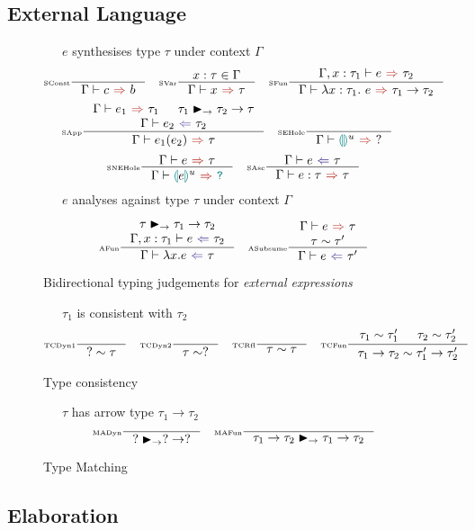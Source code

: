 \subsection{External Language}
\begin{figure}[H]
\ \ \ $e$ synthesises type $\tau$ under context $\Gamma$
\[\inference[\tiny SConst]{}{\synthesis{c}{b}} \quad
\inference[\tiny SVar]{x : \tau \in \Gamma}{\synthesis{x}{\tau}} \quad 
\inference[\tiny SFun]{\synthesis[\Gamma,x:\tau_1]{e}{\tau_2}}{\synthesis{\lambda x:\tau_1.\ e}{\tau_1 \to \tau_2}}\]
\[\inference[\tiny SApp]{\synthesis{e_1}{\tau_1} & \tau_1 \funmatch \tau_2 \to \tau \\ \analysis{e_2}{\tau_2}}{\synthesis{e_1(e_2)}{\tau}} \quad 
\inference[\tiny SEHole]{}{\synthesis{\hole^u}{?}} \quad \]
\[\inference[\tiny SNEHole]{\synthesis{e}{\tau}}{\synthesis{\hole[e]^u}{\dyn}}\quad 
\inference[\tiny SAsc]{\analysis{e}{\tau}}{\synthesis{e : \tau}{\tau}}\]
\ \ \ $e$ analyses against type $\tau$ under context $\Gamma$

\[\inference[\tiny AFun]{\tau \funmatch \tau_1 \to \tau_2\\ \analysis[\Gamma, x:\tau_1]{e}{\tau_2}}{\analysis{\lambda x.e}{\tau}} \quad 
\inference[\tiny ASubsume]{\synthesis{e}{\tau}\\ \tau \sim \tau'}{\analysis{e}{\tau'}}\]

\caption{Bidirectional typing judgements for \textit{external expressions}}
\label{fig:typing}
\end{figure} 


\begin{figure}[H]
\ \ \ $\tau_1$ is consistent with $\tau_2$
\[\inference[\tiny TCDyn1]{}{? \sim \tau} \quad \inference[\tiny TCDyn2]{}{\tau \sim ?} \quad \inference[\tiny TCRfl]{}{\tau \sim \tau} \quad \inference[\tiny TCFun]{\tau_1 \sim \tau_1' & \tau_2 \sim \tau_2'}{\tau_1 \to \tau_2 \sim \tau_1' \to \tau_2'}\]
\caption{Type consistency}
\label{fig:consistency}
\end{figure}

\begin{figure}[h]
\ \ \ $\tau$ has arrow type $\tau_1 \to \tau_2$
\[\inference[\tiny MADyn]{}{? \funmatch ? \to ?} \quad 
\inference[\tiny MAFun]{}{\tau_1 \to \tau_2 \funmatch \tau_1 \to \tau_2}\]
\caption{Type Matching}
\label{fig:typematching}
\end{figure}


\subsection{Elaboration}

